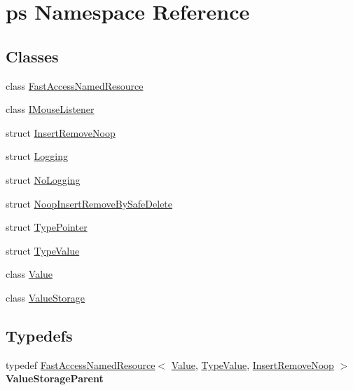 \hypertarget{namespaceps}{}\section{ps Namespace Reference}
\label{namespaceps}
\subsection*{Classes}
\begin{DoxyCompactItemize}
\item 
class \hyperlink{classps_1_1FastAccessNamedResource}{Fast\+Access\+Named\+Resource}
\item 
class \hyperlink{classps_1_1IMouseListener}{I\+Mouse\+Listener}
\item 
struct \hyperlink{structps_1_1InsertRemoveNoop}{Insert\+Remove\+Noop}
\item 
struct \hyperlink{structps_1_1Logging}{Logging}
\item 
struct \hyperlink{structps_1_1NoLogging}{No\+Logging}
\item 
struct \hyperlink{structps_1_1NoopInsertRemoveBySafeDelete}{Noop\+Insert\+Remove\+By\+Safe\+Delete}
\item 
struct \hyperlink{structps_1_1TypePointer}{Type\+Pointer}
\item 
struct \hyperlink{structps_1_1TypeValue}{Type\+Value}
\item 
class \hyperlink{classps_1_1Value}{Value}
\item 
class \hyperlink{classps_1_1ValueStorage}{Value\+Storage}
\end{DoxyCompactItemize}
\subsection*{Typedefs}
\begin{DoxyCompactItemize}
\item 
\hypertarget{namespaceps_a093e20caef0f57b4569af48ba09820cf}{}typedef \hyperlink{classps_1_1FastAccessNamedResource}{Fast\+Access\+Named\+Resource}$<$ \hyperlink{classps_1_1Value}{Value}, \hyperlink{structps_1_1TypeValue}{Type\+Value}, \hyperlink{structps_1_1InsertRemoveNoop}{Insert\+Remove\+Noop} $>$ {\bfseries Value\+Storage\+Parent}\label{namespaceps_a093e20caef0f57b4569af48ba09820cf}

\end{DoxyCompactItemize}
